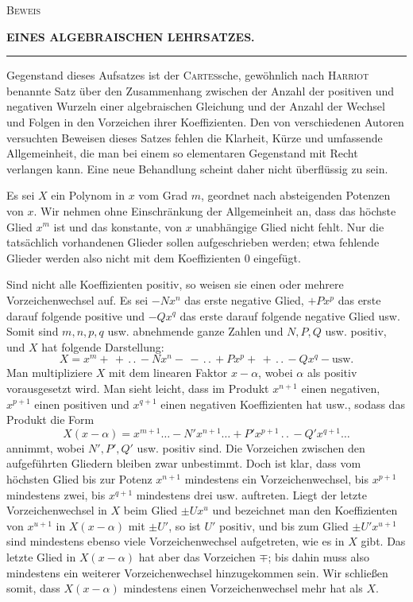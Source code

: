 \begin{center}
\textsc{Beweis}\par\medskip
{\large\bfseries EINES ALGEBRAISCHEN LEHRSATZES.}\par\medskip
\rule{0.28\linewidth}{0.4pt}
\end{center}
Gegenstand dieses Aufsatzes ist der \textsc{Cartes}sche, gewöhnlich nach \textsc{Harriot} benannte Satz über den Zusammenhang zwischen der Anzahl der positiven und negativen Wurzeln einer algebraischen Gleichung und der Anzahl der Wechsel und Folgen in den Vorzeichen ihrer Koeffizienten. Den von verschiedenen Autoren versuchten Beweisen dieses Satzes fehlen die Klarheit, Kürze und umfassende Allgemeinheit, die man bei einem so elementaren Gegenstand mit Recht verlangen kann. Eine neue Behandlung scheint daher nicht überflüssig zu sein.

Es sei $X$ ein Polynom in $x$ vom Grad $m$, geordnet nach absteigenden Potenzen von $x$. Wir nehmen ohne Einschränkung der Allgemeinheit an, dass das höchste Glied $x^m$ ist und das konstante, von $x$ unabhängige Glied nicht fehlt. Nur die tatsächlich vorhandenen Glieder sollen aufgeschrieben werden; etwa fehlende Glieder werden also nicht mit dem Koeffizienten $0$ eingefügt.

Sind nicht alle Koeffizienten positiv, so weisen sie einen oder mehrere Vorzeichenwechsel auf. Es sei $-Nx^n$ das erste negative Glied, $+Px^p$ das erste darauf folgende positive und $-Qx^q$ das erste darauf folgende negative Glied usw. Somit sind $m,n,p,q$ usw. abnehmende ganze Zahlen und $N,P,Q$ usw. positiv, und $X$ hat folgende Darstellung:
\[
X=x^m+\,+\, .\, .\,-Nx^n-\,-\, .\, .\,+Px^p+\,+\, .\, .\,-Qx^q-\text{usw.}
\]
Man multipliziere $X$ mit dem linearen Faktor $x-\alpha$, wobei $\alpha$ als positiv vorausgesetzt wird. Man sieht leicht, dass im Produkt $x^{n+1}$ einen negativen, $x^{p+1}$ einen positiven und $x^{q+1}$ einen negativen Koeffizienten hat usw., sodass das Produkt die Form
\[
X(x-\alpha)=x^{m+1}\ldots-N'x^{n+1}\ldots
+P'x^{p+1}\, .\, .\,-Q'x^{q+1}\ldots
\]
annimmt, wobei $N',P',Q'$ usw. positiv sind. Die Vorzeichen zwischen den aufgeführten Gliedern bleiben zwar unbestimmt. Doch ist klar, dass vom höchsten Glied bis zur Potenz $x^{n+1}$ mindestens ein Vorzeichenwechsel, bis $x^{p+1}$ mindestens zwei, bis $x^{q+1}$ mindestens drei usw. auftreten. Liegt der letzte Vorzeichenwechsel in $X$ beim Glied $\pm Ux^u$ und bezeichnet man den Koeffizienten von $x^{u+1}$ in $X(x-\alpha)$ mit $\pm U'$, so ist $U'$ positiv, und bis zum Glied $\pm U'x^{u+1}$ sind mindestens ebenso viele Vorzeichenwechsel aufgetreten, wie es in $X$ gibt. Das letzte Glied in $X(x-\alpha)$ hat aber das Vorzeichen $\mp$; bis dahin muss also mindestens ein weiterer Vorzeichenwechsel hinzugekommen sein. Wir schließen somit, dass $X(x-\alpha)$ mindestens einen Vorzeichenwechsel mehr hat als $X$.

